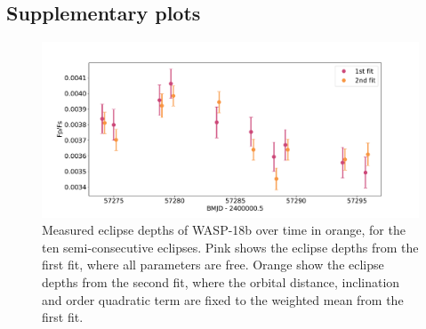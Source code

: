 \begin{subappendices}

\section{Supplementary plots}
\label{P3:app:plots}

\begin{figure}
    \centering
    \includegraphics[width=\linewidth]{Wasp18b_EclipseDepths1stv2nd.pdf}
    \caption{Measured eclipse depths of WASP-18b over time in orange, for the ten semi-consecutive eclipses. Pink shows the eclipse depths from the first fit, where all parameters are free. Orange show the eclipse depths from the second fit, where the orbital distance, inclination and  order quadratic term are fixed to the weighted mean from the first fit.}
    \label{P3:app:depths}
\end{figure}


\end{subappendices}

